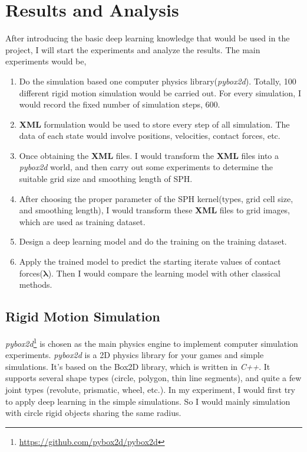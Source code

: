 \chapter{Results and Analysis}
\label{details}
After introducing the basic deep learning knowledge that would be used in the project, I will start the experiments and analyze the results. The main experiments would be,
\begin{enumerate}
    \item Do the simulation based one computer physics library(\textit{pybox2d}). Totally, 100 different rigid motion simulation would be carried out. For every simulation, I would record the fixed number of simulation steps, $600$.
    \item \textbf{XML} formulation would be used to store every step of all simulation. The data of each state would involve positions, velocities, contact forces, etc.
    \item Once obtaining the \textbf{XML} files. I would transform the \textbf{XML} files into a \textit{pybox2d} world, and then carry out some experiments to determine the suitable grid size and smoothing length of SPH.
    \item After choosing the proper parameter of the SPH kernel(types, grid cell size, and smoothing length), I would transform these \textbf{XML} files to grid images, which are used as training dataset. 
    \item Design a deep learning model and do the training on the training dataset.
    \item Apply the trained model to predict the starting iterate values of contact forces($\pmb{\lambda}$). Then I would compare the learning model with other classical methods.
\end{enumerate}

\section{Rigid Motion Simulation}

\textit{pybox2d}\footnote{\url{https://github.com/pybox2d/pybox2d}} is chosen as the main physics engine to implement computer simulation experiments. \textit{pybox2d} is a 2D physics library for your games and simple simulations. It's based on the Box2D library, which is written in \textit{C++}. It supports several shape types (circle, polygon, thin line segments), and quite a few joint types (revolute, prismatic, wheel, etc.). In my experiment, I would first try to apply deep learning in the simple simulations. So I would mainly simulation with circle rigid objects sharing the same radius. 


